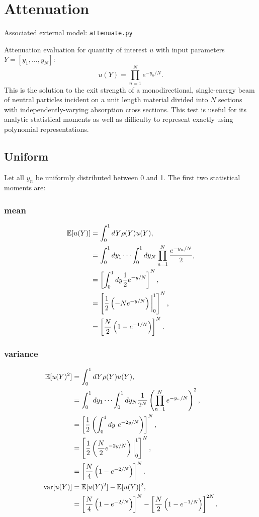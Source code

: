 \section{Attenuation}
Associated external model: \texttt{attenuate.py}

Attenuation evaluation for quantity of interest $u$ with input parameters $Y=[y_1,\ldots,y_N]$:
\begin{equation}
u(Y) = \prod_{n=1}^N e^{-y_n/N}.
\end{equation}
This is the solution to the exit strength of a monodirectional, single-energy beam of neutral particles
incident on a unit length material divided into $N$ sections with independently-varying absorption cross
sections.  This test is useful for its analytic statistical moments as well as difficulty to represent 
exactly using polynomial representations.

\subsection{Uniform}
Let all $y_n$ be uniformly distributed between 0 and 1.  The first two statistical moments are:
\subsubsection{mean}
\begin{align}
\mathbb{E}[ u(Y)] &=\int_{0}^1 dY \rho(Y)u(Y),\\
  &=\int_{0}^1 dy_1\cdots\int_{0}^1 dy_N \prod_{n=1}^N \frac{e^{-y_n/N}}{2},\\
  &=\left[ \int_{0}^1 dy \frac{1}{2}e^{-y/N}\right]^N,\\
  &=\left[\frac{1}{2}\left(-Ne^{-y/N}\right)\bigg|_0^1\right]^N,\\
  &=\left[\frac{N}{2}\left(1-e^{-1/N}\right)\right]^N.
\end{align}
\subsubsection{variance}
\begin{align}
\mathbb{E}[ u(Y)^2] &= \int_{0}^1 dY \rho(Y)u(Y),\\
  &=\int_{0}^1 dy_1\cdots\int_{0}^1 dy_N \frac{1}{2^N} \left(\prod_{n=1}^N e^{-y_n/N}\right)^2,\\
  &=\left[\frac{1}{2}\left(\int_{0}^1 dy\ e^{-2y/N} \right)\right]^N,\\
  &=\left[\frac{1}{2}\left(\frac{N}{2}e^{-2y/N} \right)\bigg|_{0}^1 \right]^N,\\
  &=\left[\frac{N}{4}\left(1-e^{-2/N}\right)\right]^N.\\
\text{var}[u(Y)] &= \mathbb{E}[ u(Y)^2]-\mathbb{E}[ u(Y)]^2,\\
  &= \left[\frac{N}{4}\left(1-e^{-2/N}\right)\right]^N - \left[\frac{N}{2}\left(1-e^{-1/N}\right)\right]^{2N}.
\end{align}
